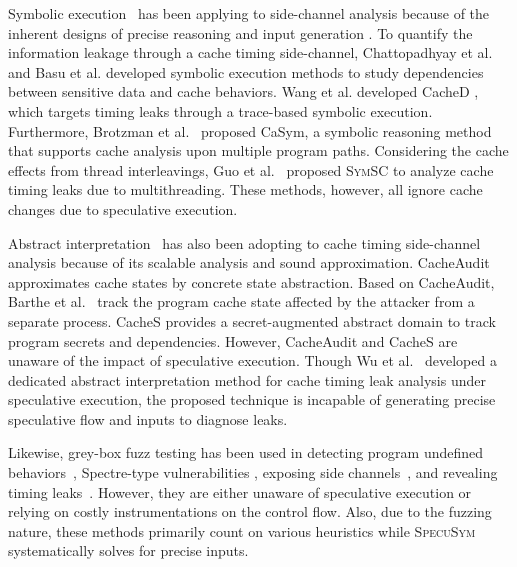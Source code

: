\documentclass[sigconf]{acmart}
\newcommand\ignore[1]{}
\newcommand{\SpecuSym}{\textsc{SpecuSym} }
\begin{document}
Symbolic execution~\cite{King76} has been applying to side-channel analysis 
because of the inherent designs of precise reasoning and input generation
\cite{PasareanuPM16,BangAPPB16,PhanBPMB17,BrennanSB18,BangRB18}.
To quantify the information leakage through a cache timing side-channel, 
Chattopadhyay et al.~\cite{ChattopadhyayBRZ17,Chattopadhyay17} and Basu et al.
\cite{BasuC17} developed symbolic execution methods to study dependencies 
between sensitive data and cache behaviors. Wang et al. developed CacheD
\cite{WangWLZW17}, which targets timing leaks through a trace-based symbolic 
execution. Furthermore, Brotzman et al.~\cite{BrotzmanLZTK2018} proposed 
CaSym, a symbolic reasoning method that supports cache analysis upon multiple 
program paths. Considering the cache effects from thread interleavings, Guo
et al.~\cite{GuoWW18} proposed \textsc{SymSC} to analyze cache timing leaks 
due to multithreading. These methods, however, all ignore cache changes due 
to speculative execution.  


Abstract interpretation~\cite{CousotC77} has also been adopting to cache timing
side-channel analysis because of its scalable analysis and sound approximation. 
CacheAudit~\cite{DoychevFKMR13} approximates cache states by concrete state 
abstraction. Based on CacheAudit, Barthe et al.~\cite{BartheKMO14} track the 
program cache state affected by the attacker from a separate process. CacheS
\cite{WangBLWZW19} provides a secret-augmented abstract domain to track program 
secrets and dependencies. However, CacheAudit and CacheS are unaware of the 
impact of speculative execution. Though Wu et al.~\cite{WuW19} developed a 
dedicated abstract interpretation method for cache timing leak analysis under 
speculative execution, the proposed technique is incapable of generating precise 
speculative flow and inputs to diagnose leaks. 


\ignore{
It treats public data in a coarse-grained 
fashion and secret data in a finer-grained manner to balance the scalability 
and precision.
}


Likewise, grey-box fuzz testing has been used in detecting program 
undefined behaviors~\cite{ChenLXGZZWL19}, Spectre-type vulnerabilities
\cite{OleksenkoTSF19}, exposing side channels~\cite{NilizadehNP19}, and 
revealing timing leaks~\cite{HeEC19}. However, they are either unaware 
of speculative execution or relying on costly instrumentations on the 
control flow. Also, due to the fuzzing nature, these methods primarily 
count on various heuristics while \SpecuSym systematically solves for 
precise inputs.
\end{document}
